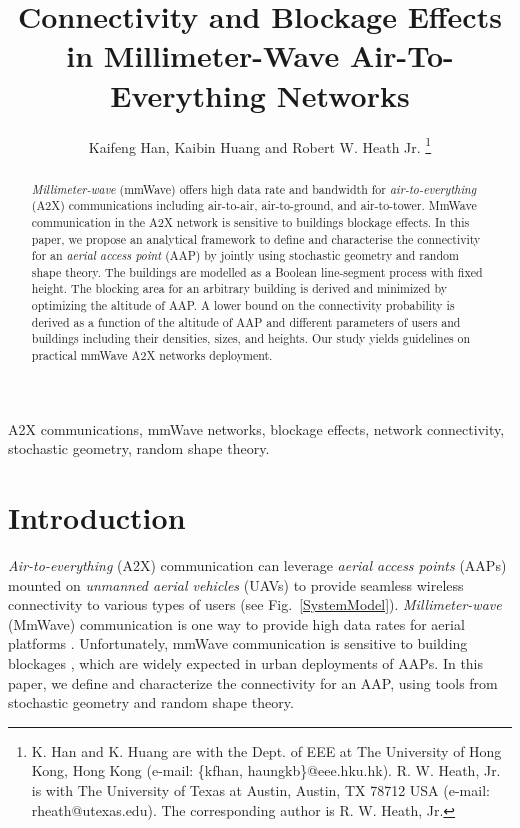 \documentclass[12pt, draftclsnofoot, onecolumn]{IEEEtran}
\begin{document}
\addtolength{\textfloatsep}{-15pt}
%

\title{\huge Connectivity and Blockage Effects in Millimeter-Wave Air-To-Everything Networks}
\author{Kaifeng Han, Kaibin Huang and Robert W. Heath Jr. \thanks{K. Han and K. Huang are with the Dept. of EEE at The  University of  Hong Kong, Hong Kong (e-mail: \{kfhan, haungkb\}@eee.hku.hk). R. W. Heath, Jr. is with The University of Texas at Austin, Austin, TX 78712 USA (e-mail: rheath@utexas.edu). The corresponding author is R. W. Heath, Jr.}}
\maketitle

\begin{abstract}
\emph{Millimeter-wave} (mmWave) offers high data rate and bandwidth for \emph{air-to-everything} (A2X) communications including  air-to-air, air-to-ground, and air-to-tower. MmWave communication in the A2X network is sensitive to buildings blockage effects.
In this paper, we  propose an analytical framework to define and characterise the connectivity for an \emph{aerial access point} (AAP) by jointly using stochastic geometry and random shape theory. The buildings are modelled as a Boolean line-segment process with fixed height. The blocking area for an arbitrary building is derived and minimized by optimizing the altitude of AAP. A  lower bound on the connectivity probability is derived as a function of the altitude of AAP and different parameters  of users and buildings including their densities, sizes, and heights. Our study yields guidelines on practical mmWave A2X networks deployment.
\end{abstract}

\begin{IEEEkeywords}
A2X communications, mmWave networks, blockage effects, network connectivity, stochastic geometry, random shape theory.
\end{IEEEkeywords}

\section{Introduction}
\emph{Air-to-everything} (A2X) communication  can leverage \emph{aerial access points} (AAPs) mounted on \emph{unmanned aerial vehicles} (UAVs) to provide seamless wireless connectivity to various types of users \cite{zeng2016wireless} (see Fig.~\ref{SystemModel}). \emph{Millimeter-wave} (MmWave) communication is one way to provide high data rates for aerial platforms \cite{xiao2016enabling}. Unfortunately, mmWave communication is sensitive to building blockages  \cite{andrews2017modeling}, which are widely expected in urban deployments of AAPs. In this paper, we define and characterize the connectivity for an AAP, using tools from stochastic geometry and random shape theory.
\end{document}
